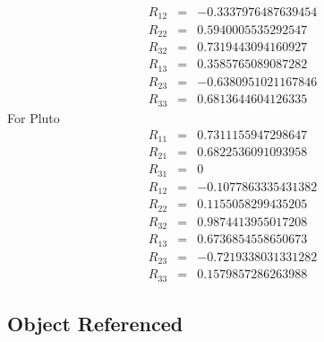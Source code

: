 {\begin{eqnarray}
   R_{12} & = &  -0.3337976487639454 \nonumber \\
   R_{22} & = &  0.5940005535292547 \nonumber \\
   R_{32} & = &  0.7319443094160927 \nonumber \\
   R_{13} & = &  0.3585765089087282 \nonumber \\
   R_{23} & = &  -0.6380951021167846 \nonumber \\
   R_{33} & = &  0.6813644604126335
\end{eqnarray}
%
For Pluto
%
\begin{eqnarray}
   R_{11} & = &  0.7311155947298647 \nonumber \\
   R_{21} & = &  0.6822536091093958 \nonumber \\
   R_{31} & = &  0 \nonumber \\
   R_{12} & = &  -0.1077863335431382 \nonumber \\
   R_{22} & = &  0.1155058299435205 \nonumber \\
   R_{32} & = &  0.9874413955017208 \nonumber \\
   R_{13} & = &  0.6736854558650673 \nonumber \\
   R_{23} & = &  -0.7219338031331282 \nonumber \\
   R_{33} & = &  0.1579857286263988
\end{eqnarray}
%

\subsection{Object Referenced}

}
